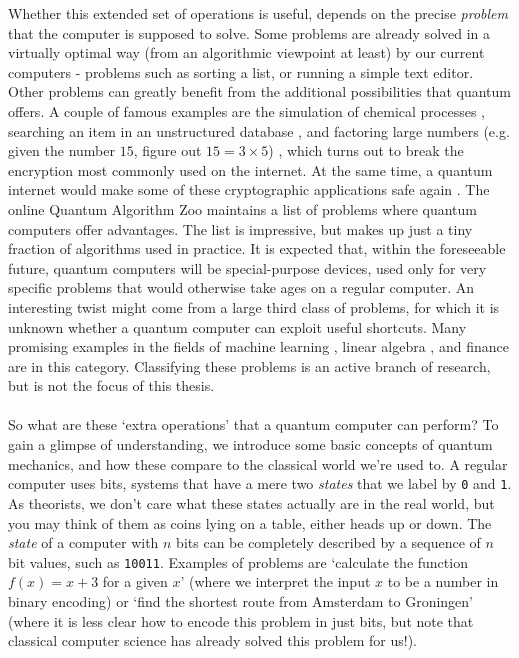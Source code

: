 Whether this extended set of operations is useful, depends on the precise \emph{problem} that the computer is supposed to solve. Some problems are already solved in a virtually optimal way (from an algorithmic viewpoint at least) by our current computers - problems such as sorting a list, or running a simple text editor. Other problems can greatly benefit from the additional possibilities that quantum offers. A couple of famous examples are the simulation of chemical processes \cite{Lloyd1996}, searching an item in an unstructured database \cite{Grover1996}, and factoring large numbers (e.g. given the number $15$, figure out $15 = 3 \times 5$) \cite{Shor1994}, which turns out to break the encryption most commonly used on the internet. At the same time, a quantum internet would make some of these cryptographic applications safe again \cite{Bennett1984}. The online Quantum Algorithm Zoo \cite{AlgZoo} maintains a list of problems where quantum computers offer advantages. The list is impressive, but makes up just a tiny fraction of algorithms used in practice. It is expected that, within the foreseeable future, quantum computers will be special-purpose devices, used only for very specific problems that would otherwise take ages on a regular computer. An interesting twist might come from a large third class of problems, for which it is unknown whether a quantum computer can exploit useful shortcuts. Many promising examples in the fields of machine learning \cite{Biamonte2017}, linear algebra \cite{Montanaro2016}, and finance \cite{Rebentrost2018,Woerner2019} are in this category. Classifying these problems is an active branch of research, but is not the focus of this thesis. 



\paragraph{} So what are these `extra operations' that a quantum computer can perform? To gain a glimpse of understanding, we introduce some basic concepts of quantum mechanics, and how these compare to the classical world we're used to. A regular computer uses bits, systems that have a mere two \emph{states} that we label by \texttt{0} and \texttt{1}. As theorists, we don't care what these states actually are in the real world, but you may think of them as coins lying on a table, either heads up or down. The \emph{state} of a computer with $n$ bits can be completely described by a sequence of $n$ bit values, such as \texttt{10011}. Examples of problems are `calculate the function $f(x) = x+3$ for a given $x$' (where we interpret the input $x$ to be a number in binary encoding) or `find the shortest route from Amsterdam to Groningen' (where it is less clear how to encode this problem in just bits, but note that classical computer science has already solved this problem for us!). 

